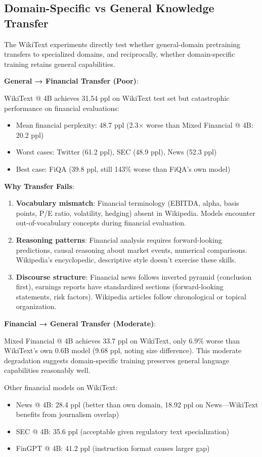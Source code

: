 \subsection{Domain-Specific vs General Knowledge Transfer}

The WikiText experiments directly test whether general-domain pretraining transfers to specialized domains, and reciprocally, whether domain-specific training retains general capabilities.

\textbf{General → Financial Transfer (Poor)}:

WikiText @ 4B achieves 31.54 ppl on WikiText test set but catastrophic performance on financial evaluations:
\begin{itemize}
\item Mean financial perplexity: 48.7 ppl (2.3$\times$ worse than Mixed Financial @ 4B: 20.2 ppl)
\item Worst cases: Twitter (61.2 ppl), SEC (48.9 ppl), News (52.3 ppl)
\item Best case: FiQA (39.8 ppl, still 143\% worse than FiQA's own model)
\end{itemize}

\textbf{Why Transfer Fails}:
\begin{enumerate}
\item \textbf{Vocabulary mismatch}: Financial terminology (EBITDA, alpha, basis points, P/E ratio, volatility, hedging) absent in Wikipedia. Models encounter out-of-vocabulary concepts during financial evaluation.
\item \textbf{Reasoning patterns}: Financial analysis requires forward-looking predictions, causal reasoning about market events, numerical comparisons. Wikipedia's encyclopedic, descriptive style doesn't exercise these skills.
\item \textbf{Discourse structure}: Financial news follows inverted pyramid (conclusion first), earnings reports have standardized sections (forward-looking statements, risk factors). Wikipedia articles follow chronological or topical organization.
\end{enumerate}

\textbf{Financial → General Transfer (Moderate)}:

Mixed Financial @ 4B achieves 33.7 ppl on WikiText, only 6.9\% worse than WikiText's own 0.6B model (9.68 ppl, noting size difference). This moderate degradation suggests domain-specific training preserves general language capabilities reasonably well.

Other financial models on WikiText:
\begin{itemize}
\item News @ 4B: 28.4 ppl (better than own domain, 18.92 ppl on News—WikiText benefits from journalism overlap)
\item SEC @ 4B: 35.6 ppl (acceptable given regulatory text specialization)
\item FinGPT @ 4B: 41.2 ppl (instruction format causes larger gap)
\end{itemize}

